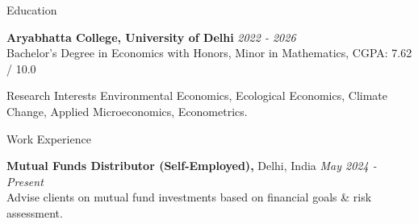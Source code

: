 \documentclass{resume} %
\begin{document}
	
	
	\begin{rSection}{Education}
		
		\textbf{Aryabhatta College, University of Delhi} \hfill \textit{2022 - 2026}
		\\ Bachelor’s Degree in Economics with Honors, Minor in Mathematics, CGPA: 7.62 / 10.0
		
	\end{rSection}
	
	
	\begin{rSection}{Research Interests}
		Environmental Economics, Ecological Economics, Climate Change, Applied Microeconomics, Econometrics.
	\end{rSection}
	
	\begin{rSection}{Work Experience}
		
		\textbf{Mutual Funds Distributor (Self-Employed),} Delhi, India \hfill \textit{May 2024 - Present} \\
		Advise clients on mutual fund investments based on financial goals \& risk assessment.
		
	\end{rSection}
	
	
\end{document}
